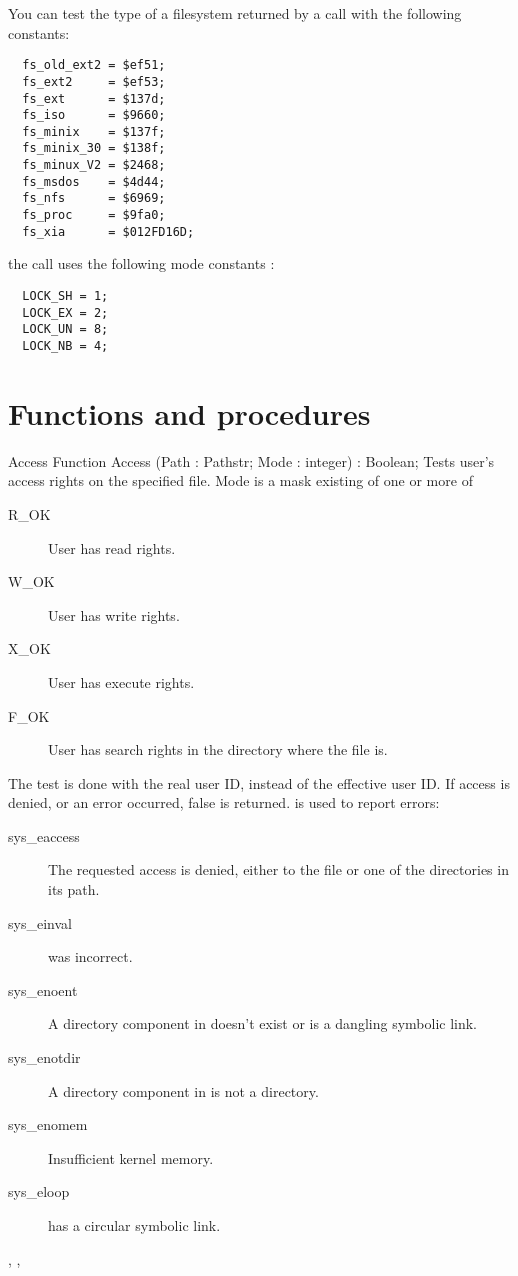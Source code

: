 You can test the type of a filesystem returned by a  call with
the following constants:
\begin{verbatim}
  fs_old_ext2 = $ef51;
  fs_ext2     = $ef53;
  fs_ext      = $137d;
  fs_iso      = $9660;
  fs_minix    = $137f;
  fs_minix_30 = $138f;
  fs_minux_V2 = $2468;
  fs_msdos    = $4d44;
  fs_nfs      = $6969;
  fs_proc     = $9fa0;
  fs_xia      = $012FD16D;
\end{verbatim}
the  call uses the following mode constants :
\begin{verbatim}
  LOCK_SH = 1;
  LOCK_EX = 2;
  LOCK_UN = 8;
  LOCK_NB = 4;
\end{verbatim}
\section{Functions and procedures}

\begin{function}{Access}
\Declaration
Function Access (Path : Pathstr; Mode : integer) : Boolean;
\Description
Tests user's access rights on the specified file. Mode is a mask existing of
one or more of
\begin{description}
\item[R\_OK] User has read rights.
\item[W\_OK] User has write rights.
\item[X\_OK] User has execute rights.
\item[F\_OK] User has search rights in the directory where the file is.
\end{description}
The test is done with the real user ID, instead of the effective user ID.
If access is denied, or an error occurred, false is returned.
\Errors
  is used to report errors:
\begin{description}
\item[sys\_eaccess] The requested access is denied, either to the file or one
of the directories in its path.
\item[sys\_einval]  was incorrect.
\item[sys\_enoent] A directory component in  doesn't exist or is a
dangling symbolic link.
\item[sys\_enotdir] A directory component in  is not a directory.
\item[sys\_enomem] Insufficient kernel memory.
\item[sys\_eloop]  has a circular symbolic link.
\end{description}

\SeeAlso
{}, ,  
\end{function}

